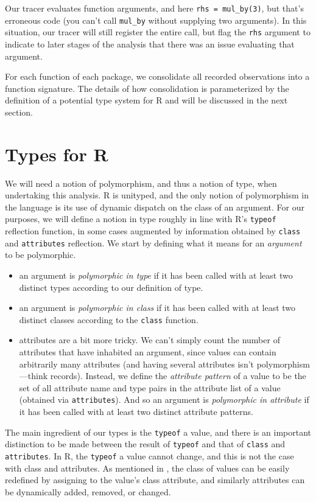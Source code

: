 \documentclass[acmsmall,10pt,review,anonymous]{acmart}\settopmatter{printfolios=true,printccs=false,printacmref=false}
\newcommand{\code}[1]{\lstinline|#1|\xspace}
\begin{document}
Our tracer evaluates function arguments, and here \code{rhs = mul_by(3)},
but that's erroneous code (you can't call {\tt mul\_by} without supplying
two arguments).  In this situation, our tracer will still register the
entire call, but flag the {\tt rhs} argument to indicate to later stages of
the analysis that there was an issue evaluating that argument.

For each function of each package, we consolidate all recorded observations
into a function signature. The details of how consolidation is parameterized
by the definition of a potential type system for R and will be discussed in
the next section.


\section{Types for R}

We will need a notion of polymorphism, and thus a notion of type, when
undertaking this analysis.  R is unityped, and the only notion of
polymorphism in the language is its use of dynamic dispatch on the class of
an argument.  For our purposes, we will define a notion in type roughly in
line with R's \code{typeof} reflection function, in some cases augmented by
information obtained by \code{class} and \code{attributes} reflection.  We
start by defining what it means for an {\it argument} to be polymorphic.

\begin{itemize}
\item an argument is {\it polymorphic in type} if it has been called with at
  least two distinct types according to our definition of type.
\item an argument is {\it polymorphic in class} if it has been called with
  at least two distinct classes according to the \code{class} function.
\item attributes are a bit more tricky.  We can't simply count the number of
  attributes that have inhabited an argument, since values can contain
  arbitrarily many attributes (and having several attributes isn't
  polymorphism---think records).  Instead, we define the {\it attribute
    pattern} of a value to be the set of all attribute name and type pairs
  in the attribute list of a value (obtained via \code{attributes}).  And so
  an argument is {\it polymorphic in attribute} if it has been called with
  at least two distinct attribute patterns.
\end{itemize}

The main ingredient of our types is the {\tt typeof} a value, and there is
an important distinction to be made between the result of \code{typeof} and
that of \code{class} and \code{attributes}.  In R, the \code{typeof} a value
cannot change, and this is not the case with class and attributes.  As
mentioned in , the class of values can be easily
redefined by assigning to the value's class attribute, and similarly
attributes can be dynamically added, removed, or changed.
\end{document}
